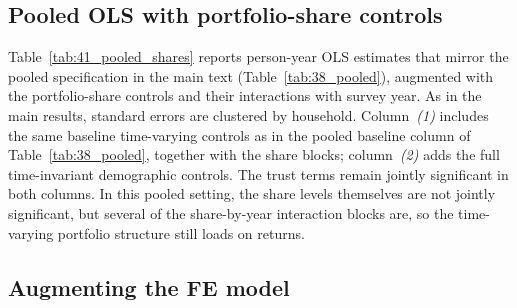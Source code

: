 \subsection{Pooled OLS with portfolio-share controls}

\par Table~\ref{tab:41_pooled_shares} reports person-year OLS estimates that mirror the pooled specification in the main text (Table~\ref{tab:38_pooled}), augmented with the portfolio-share controls and their interactions with survey year. As in the main results, standard errors are clustered by household. Column~\textit{(1)} includes the same baseline time-varying controls as in the pooled baseline column of Table~\ref{tab:38_pooled}, together with the share blocks; column~\textit{(2)} adds the full time-invariant demographic controls. The trust terms remain jointly significant in both columns. In this pooled setting, the share levels themselves are not jointly significant, but several of the share-by-year interaction blocks are, so the time-varying portfolio structure still loads on returns.

\begin{table}[htbp]
\centering
\caption{\textbf{Pooled OLS of Returns to Net Wealth on Trust with Portfolio-Share Controls}}
\label{tab:41_pooled_shares}
\begin{threeparttable}
\begingroup
\setlength{\tabcolsep}{2pt}%
\renewcommand{\arraystretch}{0.70}%
\scriptsize%
\resizebox{\textwidth}{!}{%
%
}%
\endgroup
\begin{tablenotes}[flushleft]
\scriptsize
\item {}%
\end{tablenotes}
\end{threeparttable}
\end{table}
\FloatBarrier

\subsection{Augmenting the FE model}

